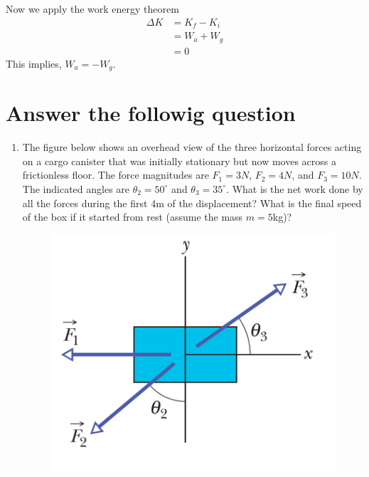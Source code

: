 \documentclass[10pt]{article}
\begin{document}
Now we apply the work energy theorem
\begin{equation}
\begin{split}
\Delta K &= K_f-K_i\\
&= W_a+W_g\\
&=0
\end{split}
\end{equation}
This implies, $W_a=-W_g$.

\section{Answer the followig question}
\begin{enumerate}
\item The figure below shows an overhead view of the three horizontal forces acting on a cargo canister that was initially stationary but now moves across a frictionless floor.  The force magnitudes are $F_1=3N$, $F_2=4N$, and $F_3=10N$.  The indicated angles are $\theta_2=50^\circ$ and $\theta_3=35^\circ$.  What is the net work done by all the forces during the first 4m of the displacement? What is the final speed of the box if it started from rest (assume the mass $m=5$kg)?
\begin{figure}[h]
\includegraphics[scale=1.2]{workonbox}
\centering
\end{figure}
\end{enumerate}
\end{document}

